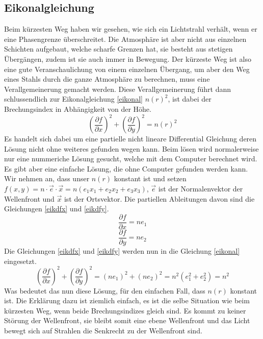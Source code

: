 \begin{refsection}
\section{Eikonalgleichung}
Beim kürzesten Weg haben wir gesehen, wie sich ein Lichtstrahl verhält, wenn er eine Phasengrenze überschreitet. Die Atmosphäre ist aber nicht aus einzelnen Schichten aufgebaut, welche scharfe Grenzen hat, sie besteht aus stetigen Übergängen, zudem ist sie auch immer in Bewegung. Der kürzeste Weg ist also eine gute Veranschaulichung von einem einzelnen Übergang, um aber den Weg eines Stahls durch die ganze Atmosphäre zu berechnen, muss eine Verallgemeinerung gemacht werden. Diese Verallgemeinerung führt dann schlussendlich zur Eikonalgleichung \eqref{eikonal} $n(r)^{2}$, ist dabei der Brechungsindex in Abhängigkeit von der Höhe. 
\begin{equation}\label{eikonal}
\left( \dfrac{\partial f}{\partial x}\right)^{2} + \left( \dfrac{\partial f}{\partial y}\right) ^{2} = n(r)^{2}
\end{equation}
Es handelt sich dabei um eine partielle nicht lineare Differential Gleichung deren Lösung nicht ohne weiteres gefunden wegen kann. Beim lösen wird normalerweise nur eine nummeriche Lösung gesucht, welche mit dem Computer berechnet wird. Es gibt aber eine einfache Lösung, die ohne Computer gefunden werden kann. Wir nehmen an, dass unser $n(r)$ konstant ist und setzen $f(x,y)=n\cdot\vec{e}\cdot\vec{x}= n(e_{1}x_{1}+e_{2}x_{2}+e_{3}x_{3})$, $\vec{e}$ ist der Normalenvektor der Wellenfront und $\vec{x}$ ist der Ortsvektor. Die partiellen Ableitungen davon sind die Gleichungen \eqref{eikdfx} und \eqref{eikdfy}.
\begin{equation}\label{eikdfx}
\dfrac{\partial f}{\partial x} = ne_{1}
\end{equation}
\begin{equation}\label{eikdfy}
\dfrac{\partial f}{\partial y} = ne_{2}
\end{equation}
Die Gleichungen \eqref{eikdfx} und \eqref{eikdfy} werden nun in die Gleichung \eqref{eikonal} eingesetzt.
\begin{equation}\label{eikonal}
\left( \dfrac{\partial f}{\partial x}\right)^{2} + \left( \dfrac{\partial f}{\partial y}\right) ^{2} = \left( ne_{1}\right) ^{2}+\left( ne_{2}\right)^{2}=n^{2}(e_{1}^{2}+e_{2}^{2})=n^{2}
\end{equation}
Was bedeutet das nun diese Lösung, für den einfachen Fall, dass $n(r)$ konstant ist. Die Erklärung dazu ist ziemlich einfach, es ist die selbe Situation wie beim kürzesten Weg, wenn beide Brechungsindizes gleich sind. Es kommt zu keiner Störung der Wellenfront, sie bleibt somit eine ebene Wellenfront und das Licht bewegt sich auf Strahlen die Senkrecht zu der Wellenfront sind.

\printbibliography[heading=subbibliography]
\end{refsection}















